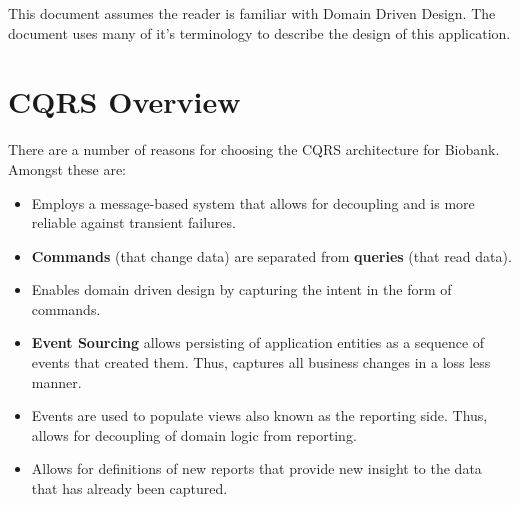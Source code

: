 This document assumes the reader is familiar with Domain Driven Design. The
document uses many of it's terminology to describe the design of this
application.

\section{CQRS Overview}

There are a number of reasons for choosing the CQRS architecture for
Biobank. Amongst these are:

\begin{itemize}
\item Employs a message-based system that allows for decoupling and is more
  reliable against transient failures.
\item \textbf{Commands} (that change data) are separated from \textbf{queries}
  (that read data).
\item Enables domain driven design by capturing the intent in the form of
  commands.
\item \textbf{Event Sourcing} allows persisting of application entities as a
  sequence of events that created them. Thus, captures all business changes in a
  loss less manner.
\item Events are used to populate views also known as the reporting side. Thus,
  allows for decoupling of domain logic from reporting.
\item Allows for definitions of new reports that provide new insight to the
  data that has already been captured.
\end{itemize}


